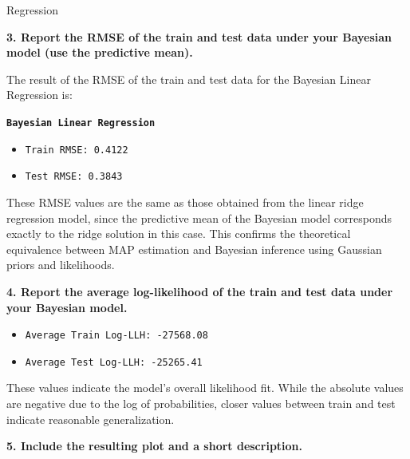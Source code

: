 \documentclass[
	english,
        solution=true
	]{tudaexercise}
\begin{document}
\begin{task}[points=34]{Regression}
\begin{subtask}[points=10, title=Bayesian Linear Regression]
\begin{solution}
            \vspace{2em}

            \textbf{3. Report the RMSE of the train and test data under your Bayesian model (use the predictive mean).}

            The result of the RMSE of the train and test data for the Bayesian Linear Regression is:

            \vspace{1em}

            \textbf{\texttt{Bayesian Linear Regression}}
            \begin{itemize}
                \item \texttt{Train RMSE: 0.4122}
                \item \texttt{Test RMSE: 0.3843}
            \end{itemize}

            \vspace{1em}

            These RMSE values are the same as those obtained from the linear ridge regression model, since the predictive mean of the Bayesian model corresponds exactly to the ridge solution in this case.
            This confirms the theoretical equivalence between MAP estimation and Bayesian inference using Gaussian priors and likelihoods.

            \vspace{2em}

            \textbf{4. Report the average log-likelihood of the train and test data under your Bayesian model.}

            \begin{itemize}
                \item \texttt{Average Train Log-LLH: -27568.08}
                \item \texttt{Average Test Log-LLH: -25265.41}
            \end{itemize}

            \vspace{1em}

            These values indicate the model's overall likelihood fit.
            While the absolute values are negative due to the log of probabilities, closer values between train and test indicate reasonable generalization.

            \vspace{2em}

            \textbf{5. Include the resulting plot and a short description.}


\end{solution}
\end{subtask}
\end{task}
\end{document}
